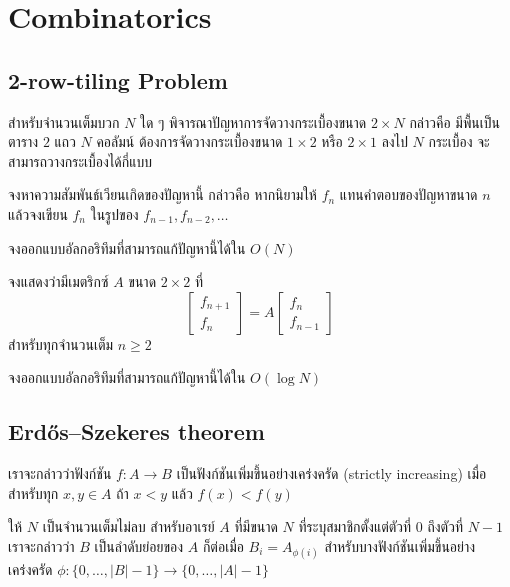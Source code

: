 \chapter{Combinatorics}

\section{2-row-tiling Problem}

สำหรับจำนวนเต็มบวก $N$ ใด ๆ พิจารณาปัญหาการจัดวางกระเบื้องขนาด $2 \times N$ กล่าวคือ มีพื้นเป็นตาราง $2$ แถว $N$ คอลัมน์ ต้องการจัดวางกระเบื้องขนาด $1 \times 2$ หรือ $2 \times 1$ ลงไป $N$ กระเบื้อง จะสามารถวางกระเบื้องได้กี่แบบ

\begin{exercise}
จงหาความสัมพันธ์เวียนเกิดของปัญหานี้ กล่าวคือ หากนิยามให้ $f_n$ แทนคำตอบของปัญหาขนาด $n$ แล้วจงเขียน $f_n$ ในรูปของ $f_{n-1}, f_{n-2}, \dots$
\end{exercise}

\begin{exercise}
จงออกแบบอัลกอริทึมที่สามารถแก้ปัญหานี้ได้ใน $O(N)$
\end{exercise}

\begin{exercise}
จงแสดงว่ามีเมตริกซ์ $A$ ขนาด $2 \times 2$ ที่
\[
\begin{bmatrix}f_{n+1} \\ f_n\end{bmatrix} = A \begin{bmatrix}f_{n}\\f_{n-1}\end{bmatrix}
\]
สำหรับทุกจำนวนเต็ม $n \geq 2$
\end{exercise}

\begin{exercise}
จงออกแบบอัลกอริทึมที่สามารถแก้ปัญหานี้ได้ใน $O(\log N)$
\end{exercise}

\section{Erdős–Szekeres theorem}

\begin{definition}
เราจะกล่าวว่าฟังก์ชัน $f \colon A \to B$ เป็นฟังก์ชันเพิ่มขึ้นอย่างเคร่งครัด (strictly increasing) เมื่อ สำหรับทุก $x, y \in A$ ถ้า $x < y$ แล้ว $f(x) < f(y)$
\end{definition}

\begin{definition}
ให้ $N$ เป็นจำนวนเต็มไม่ลบ สำหรับอาเรย์ $A$ ที่มีขนาด $N$ ที่ระบุสมาชิกตั้งแต่ตัวที่ $0$ ถึงตัวที่ $N-1$ เราจะกล่าวว่า $B$ เป็นลำดับย่อยของ $A$ ก็ต่อเมื่อ $B_i = A_{\phi(i)}$ สำหรับบางฟังก์ชันเพิ่มขึ้นอย่างเคร่งครัด $\phi \colon \{0, \dots, |B|-1\} \to \{0, \dots, |A|-1\}$
\end{definition}

